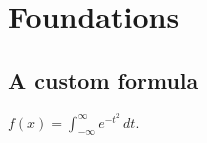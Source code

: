 \documentclass{book}
\begin{document}
\frontmatter
\tableofcontents
\mainmatter
\chapter{Foundations}
\section{A custom formula}
$\displaystyle f(x)=\int_{-\infty}^{\infty} e^{-t^2}\,dt$.
\end{document}
